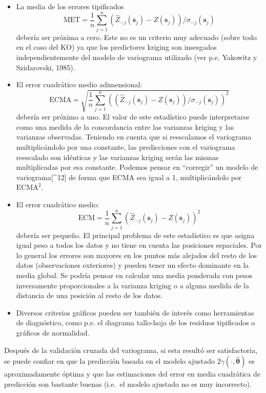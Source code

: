 \documentclass[
  spanish,
]{book}
\theoremstyle{break}
\theoremstyle{definition}
\theoremstyle{definition}
\theoremstyle{definition}
\theoremstyle{definition}
\theoremstyle{remark}
\begin{document}
\begin{itemize}
\item
  La media de los errores tipificados
  \[\text{MET} =\dfrac{1}{n} \sum\limits_{j=1}^{n}\left( \hat{Z}_{-j}
  (\mathbf{s}_{j})-Z(\mathbf{s}_{j})\right) /\sigma_{-j}(\mathbf{s}_{j}
  )\] debería ser próxima a cero. Este no es un criterio muy adecuado
  (sobre todo en el caso del KO) ya que los predictores kriging son
  insesgados independientemente del modelo de variograma utilizado (ver
  p.e. Yakowitz y Szidarovski, 1985).
\item
  El error cuadrático medio adimensional:
  \[\text{ECMA} =\sqrt{\dfrac{1}{n} \sum\limits_{j=1}^{n}\left( \left( \hat{Z}
  _{-j}(\mathbf{s}_{j})-Z(\mathbf{s}_{j})\right) /\sigma_{-j}
  (\mathbf{s}_{j})\right)^2  }\] debería ser próximo a uno. El valor
  de este estadístico puede interpretarse como una medida de la
  concordancia entre las varianzas kriging y las varianzas observadas.
  Teniendo en cuenta que si reescalamos el variograma multiplicándolo por
  una constante, las predicciones con el variograma reescalado son
  idénticas y las varianzas kriging serán las mismas multiplicadas por esa
  constante. Podemos pensar en ``corregir'' un modelo de variograma{[}\^{}12{]} de
  forma que ECMA sea igual a 1, multiplicándolo por \(\text{ECMA}^2\).
\item
  El error cuadrático medio:
  \[\text{ECM} =\dfrac{1}{n} \sum\limits_{j=1}^{n}\left( \hat{Z}_{-j}
  (\mathbf{s}_{j})-Z(\mathbf{s}_{j})\right)^2\] debería ser pequeño.
  El principal problema de este estadístico es que asigna igual peso a
  todos los datos y no tiene en cuenta las posiciones espaciales. Por lo
  general los errores son mayores en los puntos más alejados del resto de
  los datos (observaciones exteriores) y pueden tener un efecto dominante
  en la media global. Se podría pensar en calcular una media ponderada con
  pesos inversamente proporcionales a la varianza kriging o a alguna
  medida de la distancia de una posición al resto de los datos.
\item
  Diversos criterios gráficos pueden ser también de interés como
  herramientas de diagnóstico, como p.e. el diagrama tallo-hoja de los
  residuos tipificados o gráficos de normalidad.
\end{itemize}

Después de la validación cruzada del variograma, si esta resultó ser
satisfactoria, se puede confiar en que la predicción basada en el modelo
ajustado \(2\gamma(\cdot,\hat{\boldsymbol{\theta}})\) es aproximadamente óptima y que las
estimaciones del error en media cuadrática de predicción son bastante
buenas (i.e.~el modelo ajustado no es muy incorrecto).
\end{document}
